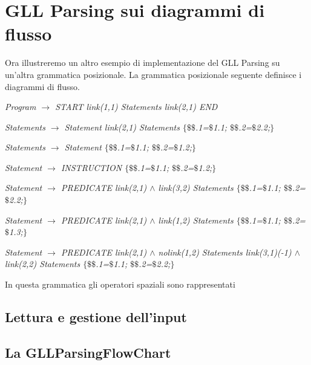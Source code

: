 \section{GLL Parsing sui diagrammi di flusso}
Ora illustreremo un altro esempio di implementazione del GLL Parsing su un'altra grammatica posizionale. La grammatica posizionale seguente definisce i diagrammi di flusso.\par
\begin{center}
	\textit{Program $\to$ START link(1,1) Statements link(2,1) END} \par
	\textit{Statements $\to$ Statement link(2,1) Statements $\{$$\$\$$.1=$\$$1.1; $\$\$$.2=$\$$2.2;$\}$} \par
	\textit{Statements $\to$ Statement $\{$$\$\$$.1=$\$$1.1; $\$\$$.2=$\$$1.2;$\}$}\par
	\textit{Statement $\to$ INSTRUCTION $\{$$\$\$$.1=$\$$1.1; $\$\$$.2=$\$$1.2;$\}$}\par
	\textit{Statement $\to$ PREDICATE link(2,1) $\wedge$ link(3,2) Statements $\{$$\$\$$.1=$\$$1.1; $\$\$$.2=$\$$2.2;$\}$}\par
	\textit{Statement $\to$ PREDICATE  link(2,1) $\wedge$ link(1,2) Statements $\{$$\$\$$.1=$\$$1.1; $\$\$$.2=$\$$1.3;$\}$}\par
	\textit{Statement $\to$ PREDICATE  link(2,1) $\wedge$ nolink(1,2) Statements link(3,1)(-1) $\wedge$ link(2,2) Statements $\{$$\$\$$.1=$\$$1.1; $\$\$$.2=$\$$2.2;$\}$}\par
\end{center}
In questa grammatica gli operatori spaziali sono rappresentati 
\subsection{Lettura e gestione dell'input}



\subsection{La GLLParsingFlowChart}